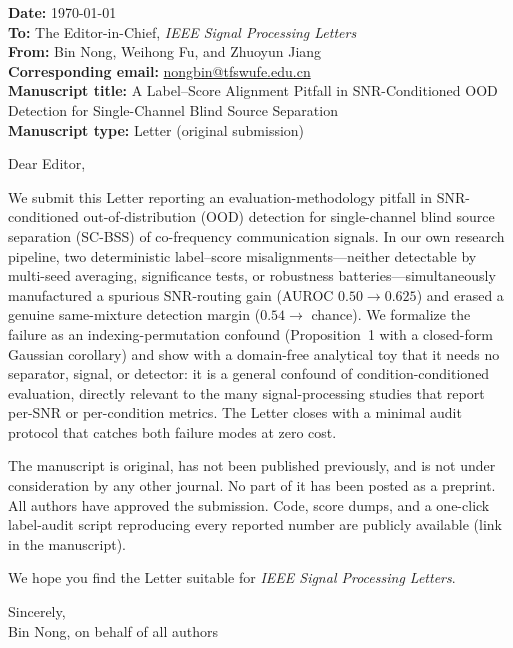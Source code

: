 \documentclass[11pt,a4paper]{article}
\begin{document}
\noindent\textbf{Date:} \today\\[2pt]
\textbf{To:} The Editor-in-Chief, \emph{IEEE Signal Processing Letters}\\
\textbf{From:} Bin Nong, Weihong Fu, and Zhuoyun Jiang\\
\textbf{Corresponding email:} \href{mailto:nongbin@tfswufe.edu.cn}{nongbin@tfswufe.edu.cn}\\
\textbf{Manuscript title:} A Label--Score Alignment Pitfall in SNR-Conditioned OOD Detection for Single-Channel Blind Source Separation\\
\textbf{Manuscript type:} Letter (original submission)

\vspace{0.6em}

\noindent Dear Editor,

We submit this Letter reporting an evaluation-methodology pitfall in
SNR-conditioned out-of-distribution (OOD) detection for single-channel
blind source separation (SC-BSS) of co-frequency communication signals.
In our own research pipeline, two deterministic label--score
misalignments---neither detectable by multi-seed averaging, significance
tests, or robustness batteries---simultaneously manufactured a spurious
SNR-routing gain (AUROC $0.50 \rightarrow 0.625$) and erased a genuine
same-mixture detection margin ($0.54 \rightarrow$ chance). We formalize
the failure as an indexing-permutation confound (Proposition~1 with a
closed-form Gaussian corollary) and show with a domain-free analytical
toy that it needs no separator, signal, or detector: it is a general
confound of condition-conditioned evaluation, directly relevant to the
many signal-processing studies that report per-SNR or per-condition
metrics. The Letter closes with a minimal audit protocol that catches
both failure modes at zero cost.

The manuscript is original, has not been published previously, and is
not under consideration by any other journal. No part of it has been
posted as a preprint. All authors have approved the submission. Code,
score dumps, and a one-click label-audit script reproducing every
reported number are publicly available (link in the manuscript).

We hope you find the Letter suitable for \emph{IEEE Signal Processing
Letters}.

\vspace{0.6em}

\noindent Sincerely,\\[2pt]
Bin Nong, on behalf of all authors
\end{document}
